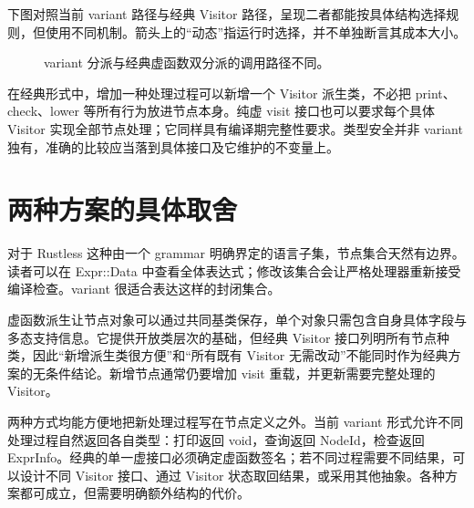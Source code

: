 下图对照当前 variant 路径与经典 Visitor 路径，呈现二者都能按具体结构选择规则，但使用不同机制。箭头上的“动态”指运行时选择，并不单独断言其成本大小。
\begin{figure}[htbp]
\centering
{}
\caption{variant 分派与经典虚函数双分派的调用路径不同。}
\end{figure}
在经典形式中，增加一种处理过程可以新增一个 Visitor 派生类，不必把 print、check、lower 等所有行为放进节点本身。纯虚 visit 接口也可以要求每个具体 Visitor 实现全部节点处理；它同样具有编译期完整性要求。类型安全并非 variant 独有，准确的比较应当落到具体接口及它维护的不变量上。

\section{两种方案的具体取舍}
对于 Rustless 这种由一个 grammar 明确界定的语言子集，节点集合天然有边界。读者可以在 Expr::Data 中查看全体表达式；修改该集合会让严格处理器重新接受编译检查。variant 很适合表达这样的封闭集合。

虚函数派生让节点对象可以通过共同基类保存，单个对象只需包含自身具体字段与多态支持信息。它提供开放类层次的基础，但经典 Visitor 接口列明所有节点种类，因此“新增派生类很方便”和“所有既有 Visitor 无需改动”不能同时作为经典方案的无条件结论。新增节点通常仍要增加 visit 重载，并更新需要完整处理的 Visitor。

两种方式均能方便地把新处理过程写在节点定义之外。当前 variant 形式允许不同处理过程自然返回各自类型：打印返回 void，查询返回 NodeId，检查返回 ExprInfo。经典的单一虚接口必须确定虚函数签名；若不同过程需要不同结果，可以设计不同 Visitor 接口、通过 Visitor 状态取回结果，或采用其他抽象。各种方案都可成立，但需要明确额外结构的代价。

